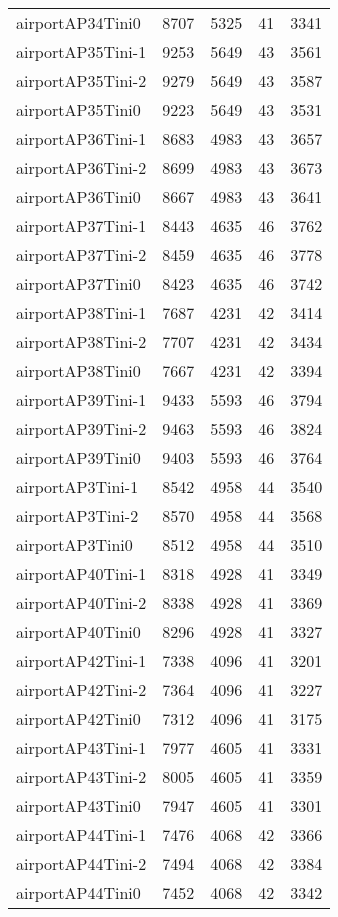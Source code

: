 \begin{longtable}{lrrrr}
airportAP34Tini0 & 8707 & 5325 & 41 & 3341 \\
airportAP35Tini-1 & 9253 & 5649 & 43 & 3561 \\
airportAP35Tini-2 & 9279 & 5649 & 43 & 3587 \\
airportAP35Tini0 & 9223 & 5649 & 43 & 3531 \\
airportAP36Tini-1 & 8683 & 4983 & 43 & 3657 \\
airportAP36Tini-2 & 8699 & 4983 & 43 & 3673 \\
airportAP36Tini0 & 8667 & 4983 & 43 & 3641 \\
airportAP37Tini-1 & 8443 & 4635 & 46 & 3762 \\
airportAP37Tini-2 & 8459 & 4635 & 46 & 3778 \\
airportAP37Tini0 & 8423 & 4635 & 46 & 3742 \\
airportAP38Tini-1 & 7687 & 4231 & 42 & 3414 \\
airportAP38Tini-2 & 7707 & 4231 & 42 & 3434 \\
airportAP38Tini0 & 7667 & 4231 & 42 & 3394 \\
airportAP39Tini-1 & 9433 & 5593 & 46 & 3794 \\
airportAP39Tini-2 & 9463 & 5593 & 46 & 3824 \\
airportAP39Tini0 & 9403 & 5593 & 46 & 3764 \\
airportAP3Tini-1 & 8542 & 4958 & 44 & 3540 \\
airportAP3Tini-2 & 8570 & 4958 & 44 & 3568 \\
airportAP3Tini0 & 8512 & 4958 & 44 & 3510 \\
airportAP40Tini-1 & 8318 & 4928 & 41 & 3349 \\
airportAP40Tini-2 & 8338 & 4928 & 41 & 3369 \\
airportAP40Tini0 & 8296 & 4928 & 41 & 3327 \\
airportAP42Tini-1 & 7338 & 4096 & 41 & 3201 \\
airportAP42Tini-2 & 7364 & 4096 & 41 & 3227 \\
airportAP42Tini0 & 7312 & 4096 & 41 & 3175 \\
airportAP43Tini-1 & 7977 & 4605 & 41 & 3331 \\
airportAP43Tini-2 & 8005 & 4605 & 41 & 3359 \\
airportAP43Tini0 & 7947 & 4605 & 41 & 3301 \\
airportAP44Tini-1 & 7476 & 4068 & 42 & 3366 \\
airportAP44Tini-2 & 7494 & 4068 & 42 & 3384 \\
airportAP44Tini0 & 7452 & 4068 & 42 & 3342 \\

\end{longtable}
